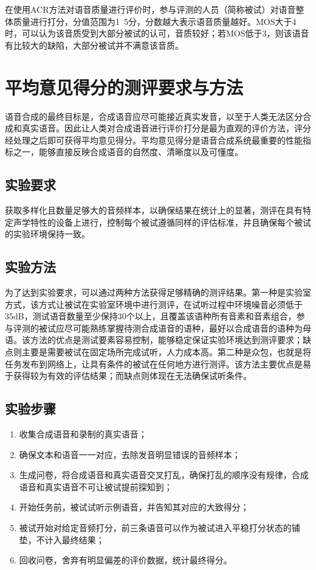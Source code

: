 \documentclass[cn,10pt,math=newtx,citestyle=gb7714-2015,bibstyle=gb7714-2015]{elegantbook}
\begin{document}
在使用ACR方法对语音质量进行评价时，参与评测的人员（简称被试）对语音整体质量进行打分，分值范围为1~5分，分数越大表示语音质量越好。MOS大于4时，可以认为该音质受到大部分被试的认可，音质较好；若MOS低于3，则该语音有比较大的缺陷，大部分被试并不满意该音质。

\section{平均意见得分的测评要求与方法}
语音合成的最终目标是，合成语音应尽可能接近真实发音，以至于人类无法区分合成和真实语音。因此让人类对合成语音进行评价打分是最为直观的评价方法，评分经处理之后即可获得平均意见得分。平均意见得分是语音合成系统最重要的性能指标之一，能够直接反映合成语音的自然度、清晰度以及可懂度。
\subsection{实验要求}
获取多样化且数量足够大的音频样本，以确保结果在统计上的显著，测评在具有特定声学特性的设备上进行，控制每个被试遵循同样的评估标准，并且确保每个被试的实验环境保持一致。
\subsection{实验方法}
为了达到实验要求，可以通过两种方法获得足够精确的测评结果。第一种是实验室方式，该方式让被试在实验室环境中进行测评，在试听过程中环境噪音必须低于35dB，测试语音数量至少保持30个以上，且覆盖该语种所有音素和音素组合，参与评测的被试应尽可能熟练掌握待测合成语音的语种，最好以合成语音的语种为母语。该方法的优点是测试要素容易控制，能够稳定保证实验环境达到测评要求；缺点则主要是需要被试在固定场所完成试听，人力成本高。第二种是众包，也就是将任务发布到网络上，让具有条件的被试在任何地方进行测评。该方法主要优点是易于获得较为有效的评估结果；而缺点则体现在无法确保试听条件。
\subsection{实验步骤}
\begin{enumerate}
  \item 收集合成语音和录制的真实语音；
  \item 确保文本和语音一一对应，去除发音明显错误的音频样本；
  \item 生成问卷，将合成语音和真实语音交叉打乱，确保打乱的顺序没有规律，合成语音和真实语音不可让被试提前探知到；
  \item 开始任务前，被试试听示例语音，并告知其对应的大致得分；
  \item 被试开始对给定音频打分，前三条语音可以作为被试进入平稳打分状态的铺垫，不计入最终结果；
  \item 回收问卷，舍弃有明显偏差的评价数据，统计最终得分。
\end{enumerate}
\end{document}
